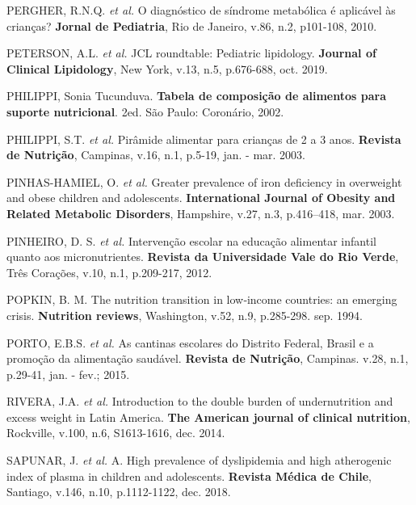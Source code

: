 \noindent PERGHER, R.N.Q. \textit{et al.} O diagnóstico de síndrome metabólica é aplicável às crianças? \textbf{Jornal de Pediatria}, Rio de Janeiro, v.86, n.2, p101-108, 2010.

\bigbreak

\noindent PETERSON, A.L. \textit{et al.} JCL roundtable: Pediatric lipidology. \textbf{Journal of Clinical Lipidology}, New York, v.13, n.5, p.676-688, oct. 2019.
 
\bigbreak

\noindent PHILIPPI, Sonia Tucunduva. \textbf{Tabela de composição de alimentos para suporte nutricional}. 2ed. São Paulo: Coronário, 2002.

\bigbreak

\noindent PHILIPPI, S.T. \textit{et al.} Pirâmide alimentar para crianças de 2 a 3 anos. \textbf{Revista de Nutrição}, Campinas, v.16, n.1, p.5-19, jan. - mar. 2003.

\bigbreak

\noindent PINHAS-HAMIEL, O. \textit{et al.} Greater prevalence of iron deficiency in overweight and obese children and adolescents. \textbf{International Journal of Obesity and Related Metabolic Disorders}, Hampshire, v.27, n.3, p.416–418, mar. 2003.

\bigbreak

\noindent PINHEIRO, D. S. \textit{et al.} Intervenção escolar na educação alimentar infantil quanto aos micronutrientes. \textbf{Revista da Universidade Vale do Rio Verde}, Três Corações, v.10, n.1, p.209-217, 2012.

\bigbreak

\noindent POPKIN, B. M. The nutrition transition in low‐income countries: an emerging crisis. \textbf{Nutrition reviews}, Washington, v.52, n.9, p.285-298. sep. 1994. 

\bigbreak

\noindent PORTO, E.B.S. \textit{et al.} As cantinas escolares do Distrito Federal, Brasil e a promoção da alimentação saudável. \textbf{Revista de Nutrição}, Campinas. v.28, n.1, p.29-41, jan. - fev.; 2015.

\bigbreak

\noindent RIVERA, J.A. \textit{et al.} Introduction to the double burden of undernutrition and excess weight in Latin America. \textbf{The American journal of clinical nutrition}, Rockville, v.100, n.6, S1613-1616, dec. 2014.

\bigbreak

\noindent SAPUNAR, J. \textit{et al.} A. High prevalence of dyslipidemia and high atherogenic index of plasma in children and adolescents. \textbf{Revista Médica de Chile}, Santiago, v.146, n.10, p.1112-1122, dec. 2018.

